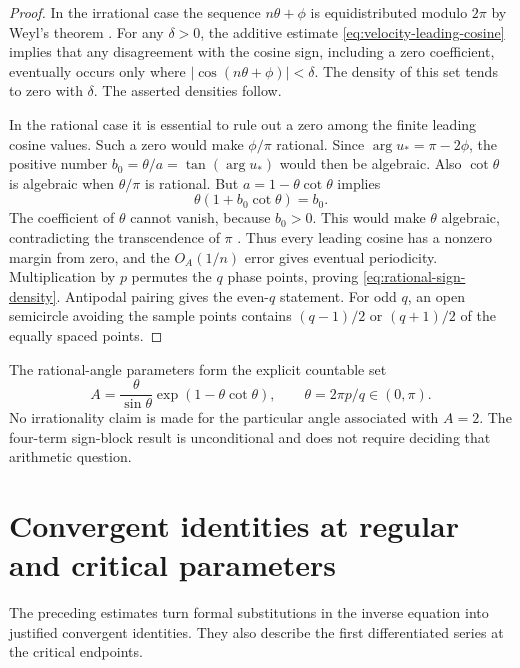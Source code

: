 \documentclass[11pt]{article}
\numberwithin{equation}{section}
\theoremstyle{definition}
\theoremstyle{remark}
\begin{document}
\begin{proof}
In the irrational case the sequence $n\theta+\phi$ is equidistributed
modulo $2\pi$ by Weyl's theorem \cite{Weyl1916}.  For any $\delta>0$, the additive estimate
\eqref{eq:velocity-leading-cosine} implies that any disagreement with
the cosine sign, including a zero coefficient, eventually occurs only
where $|\cos(n\theta+\phi)|<\delta$.  The density of this set tends to
zero with $\delta$.  The asserted densities follow.

In the rational case it is essential to rule out a zero among the finite
leading cosine values.  Such a zero would make $\phi/\pi$ rational.
Since $\arg u_*=\pi-2\phi$, the positive number
$b_0=\theta/a=\tan(\arg u_*)$ would then be algebraic.  Also
$\cot\theta$ is algebraic when $\theta/\pi$ is rational.  But
$a=1-\theta\cot\theta$ implies
\[
 \theta(1+b_0\cot\theta)=b_0.
\]
The coefficient of $\theta$ cannot vanish, because $b_0>0$.  This would
make $\theta$ algebraic, contradicting the transcendence of $\pi$ \cite{Lindemann1882}.
Thus every leading cosine has a nonzero margin from zero, and the
$O_A(1/n)$ error gives eventual periodicity.  Multiplication by $p$
permutes the $q$ phase points, proving \eqref{eq:rational-sign-density}.
Antipodal pairing gives the even-$q$ statement.  For odd $q$, an open
semicircle avoiding the sample points contains $(q-1)/2$ or $(q+1)/2$
of the equally spaced points.
\end{proof}

The rational-angle parameters form the explicit countable set
\[
 A=\frac\theta{\sin\theta}\exp(1-\theta\cot\theta),
 \qquad \theta=2\pi p/q\in(0,\pi).
\]
No irrationality claim is made for the particular angle associated with
$A=2$.  The four-term sign-block result is unconditional and does not
require deciding that arithmetic question.

\section{Convergent identities at regular and critical parameters}
\label{sec:convergent-velocity-identities}

The preceding estimates turn formal substitutions in the inverse
equation into justified convergent identities.  They also describe the
first differentiated series at the critical endpoints.
\end{document}
